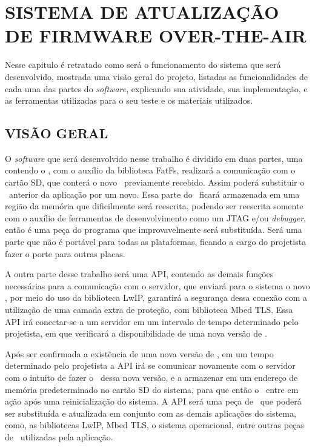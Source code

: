 
\chapter{SISTEMA DE ATUALIZAÇÃO DE FIRMWARE OVER-THE-AIR}
\label{chap:metodologia}
Nesse capitulo é retratado como será o funcionamento do sistema que será desenvolvido, mostrada uma visão geral do projeto, listadas as funcionalidades de cada uma das partes do \textit{software}, explicando sua atividade, sua implementação, e as ferramentas utilizadas para o seu teste e os materiais utilizados. 

\section{VISÃO GERAL}
O \textit{software} que será desenvolvido nesse trabalho é dividido em duas partes, uma contendo o \bootloader, com o auxílio da biblioteca FatFs, realizará a comunicação com o cartão SD, que conterá o novo \firmware\ previamente recebido. Assim poderá substituir o \software\ anterior da aplicação por um novo. Essa parte do \software\ ficará armazenada em uma região da memória que dificilmente será reescrita, podendo ser reescrita somente com o auxílio de ferramentas de desenvolvimento como um JTAG e/ou \textit{debugger}, então é uma peça do programa que improvavelmente será substituída. Será uma parte que não é portável para todas as plataformas, ficando a cargo do projetista fazer o porte para outras placas.

A outra parte desse trabalho será uma API, contendo as demais funções necessárias para a comunicação com o servidor, que enviará para o sistema o novo \firmware, por meio do uso da biblioteca LwIP, garantirá a segurança dessa conexão com a utilização de uma camada extra de proteção, com biblioteca Mbed TLS. Essa API irá conectar-se a um servidor em um intervalo de tempo determinado pelo projetista, em que verificará a disponibilidade de uma nova versão de \software. 

Após ser confirmada a existência de uma nova versão de \firmware, em um tempo determinado pelo projetista a API irá se comunicar novamente com o servidor com o intuito de fazer o \download\ dessa nova versão, e a armazenar em um endereço de memória predeterminado no cartão SD do sistema, para que então o \bootloader\ entre em ação após uma reinicialização do sistema.
A API será uma peça de \software\ que poderá ser substituída e atualizada em conjunto com as demais aplicações do sistema, como, as bibliotecas LwIP, Mbed TLS, o sistema operacional, entre outras peças de \software\ utilizadas pela aplicação. 

